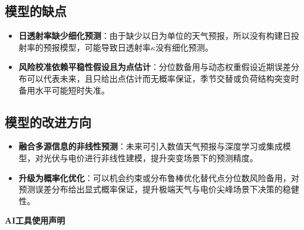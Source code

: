 \documentclass[withoutpreface,bwprint]{cumcmthesis}
\begin{document}
\subsection{模型的缺点}

\begin{itemize}
	\item \textbf{日透射率缺少细化预测}：由于缺少以日为单位的天气预报，所以没有构建日投射率的预报模型，可能导致日透射率$\kappa$没有细化预测。
	
	\item \textbf{风险校准依赖平稳性假设且为点估计}：分位数备用与动态权重假设近期误差分布可以代表未来，且只给出点估计而无概率保证，季节交替或负荷结构突变时备用水平可能短时失准。
\end{itemize}

\subsection{模型的改进方向}

\begin{itemize}
	\item \textbf{融合多源信息的非线性预测}：未来可引入数值天气预报与深度学习或集成模型，对光伏与电价进行非线性建模，提升突变场景下的预测精度。
	
	\item \textbf{升级为概率化优化}：可以机会约束或分布鲁棒优化替代点分位数风险备用，对预测误差分布给出显式概率保证，提升极端天气与电价尖峰场景下决策的稳健性。
\end{itemize}

%
%	
%	

\begin{center}
	\textbf{{\Large AI工具使用声明}}
\end{center}	
\end{document}

